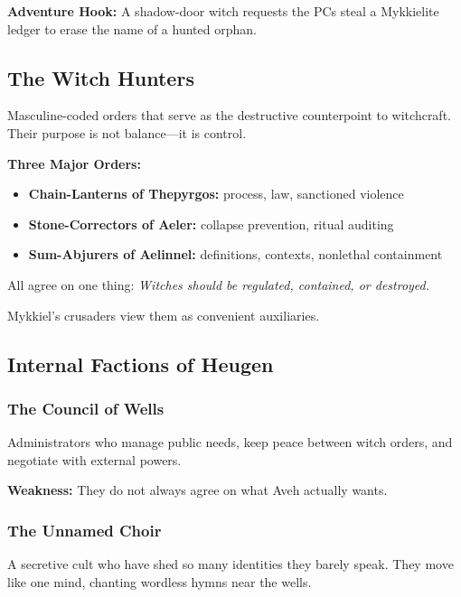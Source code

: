 \documentclass[11pt]{book}
\begin{document}
\textbf{Adventure Hook:} A shadow-door witch requests the PCs steal a Mykkielite ledger to erase the name of a hunted orphan.

\subsection{The Witch Hunters}

Masculine-coded orders that serve as the destructive counterpoint to witchcraft.  
Their purpose is not balance---it is control.

\textbf{Three Major Orders:}
\begin{itemize}
    \item \textbf{Chain-Lanterns of Thepyrgos:} process, law, sanctioned violence  
    \item \textbf{Stone-Correctors of Aeler:} collapse prevention, ritual auditing  
    \item \textbf{Sum-Abjurers of Aelinnel:} definitions, contexts, nonlethal containment  
\end{itemize}

All agree on one thing:  
\emph{Witches should be regulated, contained, or destroyed.}

Mykkiel's crusaders view them as convenient auxiliaries.

\subsection{Internal Factions of Heugen}

\subsubsection{The Council of Wells}
Administrators who manage public needs, keep peace between witch orders, and negotiate with  
external powers.

\textbf{Weakness:} They do not always agree on what Aveh actually wants.

\subsubsection{The Unnamed Choir}
A secretive cult who have shed so many identities they barely speak.  
They move like one mind, chanting wordless hymns near the wells.
\end{document}
